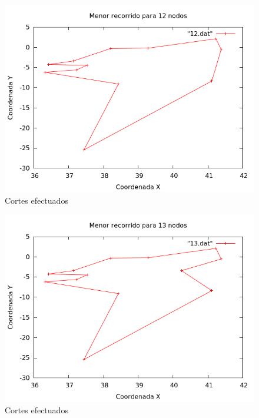 \begin{figure}[H]
    \centering
    \includegraphics[scale=0.5]{../TSP/Graficas/12.png}
    \caption{Cortes efectuados}
\end{figure}

\begin{figure}[H]
    \centering
    \includegraphics[scale=0.5]{../TSP/Graficas/13.png}
    \caption{Cortes efectuados}
\end{figure}

\newpage











